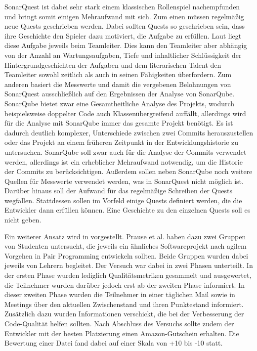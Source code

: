 \documentclass[
	oneside,  %
	ngerman, 
	final, 
	11pt, 
	a4paper, 
	1.1headlines, 
	headinclude=false, 
	footinclude=false, 
	mpinclude=false, 
	pagesize, 
	onecolumn, 
	titlepage, 
	parskip=half, 
	headsepline, 
	chapterprefix=false, 
	version=first, 
	listof=totoc, 
	bibliography=totoc, 
	toc=graduated, 
	fleqn
]{scrbook}
\begin{document}
SonarQuest ist dabei sehr stark einem klassischen Rollenspiel nachempfunden und bringt somit einigen Mehraufwand mit sich.
Zum einen müssen regelmäßig neue Quests geschrieben werden.
Dabei sollten Quests so geschrieben sein, dass ihre Geschichte den Spieler dazu motiviert, die Aufgabe zu erfüllen.
Laut \cite{SonarQuest} liegt diese Aufgabe jeweils beim Teamleiter.
Dies kann den Teamleiter aber abhängig von der Anzahl an Wartungsaufgaben, Tiefe und inhaltlicher Schlüssigkeit der Hintergrundgeschichten der Aufgaben und dem literarischen Talent den Teamleiter sowohl zeitlich als auch in seinen Fähigkeiten überfordern.
Zum anderen basiert die Messwerte und damit die vergebenen Belohnungen von SonarQuest ausschließlich auf den Ergebnissen der Analyse von SonarQube.
SonarQube bietet zwar eine Gesamtheitliche Analyse des Projekts, wodurch beispielsweise doppelter Code auch Klassenübergreifend auffällt, allerdings wird für die Analyse mit SonarQube immer das gesamte Projekt benötigt.
Es ist dadurch deutlich komplexer, Unterschiede zwischen zwei Commits herauszustellen oder das Projekt an einem früheren Zeitpunkt in der Entwicklungshistorie zu untersuchen.
SonarQube soll zwar auch für die Analyse der Commits verwendet werden, allerdings ist ein erheblicher Mehraufwand notwendig, um die Historie der Commits zu berücksichtigen.
Außerdem sollen neben SonarQube noch weitere Quellen für Messwerte verwendet werden, was in SonarQuest nicht möglich ist.
Darüber hinaus soll der Aufwand für das regelmäßige Schreiben der Quests wegfallen.
Stattdessen sollen im Vorfeld einige Quests definiert werden, die die Entwickler dann erfüllen können.
Eine Geschichte zu den einzelnen Quests soll es nicht geben.

Ein weiterer Ansatz wird in \cite{Prause2012} vorgestellt. 
Prause et al. haben dazu zwei Gruppen von Studenten untersucht, die jeweils ein ähnliches Softwareprojekt nach agilem Vorgehen in Pair Programming entwickeln sollten.
Beide Gruppen wurden dabei jeweils von Lehrern begleitet.
Der Versuch war dabei in zwei Phasen unterteilt.
In der ersten Phase wurden lediglich Qualitätsmetriken gesammelt und ausgewertet, die Teilnehmer wurden darüber jedoch erst ab der zweiten Phase informiert.
In dieser zweiten Phase wurden die Teilnehmer in einer täglichen Mail sowie in Meetings über den aktuellen Zwischenstand und ihren Punktestand informiert.
Zusätzlich dazu wurden Informationen verschickt, die bei der Verbesserung der Code-Qualität helfen sollten.
Nach Abschluss des Versuchs sollte zudem der Entwickler mit der besten Platzierung einen Amazon-Gutschein erhalten.
Die Bewertung einer Datei fand dabei auf einer Skala von +10 bis -10 statt.
\end{document}
